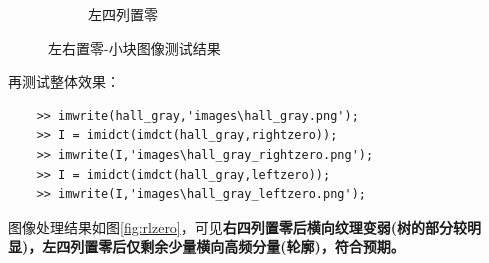 \documentclass{article}
\numberwithin{figure}{section}
\numberwithin{table}{section}
\numberwithin{listing}{section}
\numberwithin{equation}{section}
\begin{document}
\begin{enumerate}
\begin{figure}[H]
\begin{subfigure}{0.3\textwidth}
                        \caption{左四列置零}
                    \end{subfigure}
                    \caption{左右置零-小块图像测试结果}
                \end{figure}

                再测试整体效果：

                \begin{verbatim}
    >> imwrite(hall_gray,'images\hall_gray.png');
    >> I = imidct(imdct(hall_gray,rightzero));
    >> imwrite(I,'images\hall_gray_rightzero.png');
    >> I = imidct(imdct(hall_gray,leftzero));
    >> imwrite(I,'images\hall_gray_leftzero.png');
                \end{verbatim}

                图像处理结果如图\ref{fig:rlzero}，可见\textbf{右四列置零后横向纹理变弱(树的部分较明显)，左四列置零后仅剩余少量横向高频分量(轮廓)，符合预期。}


\end{enumerate}
\end{document}
